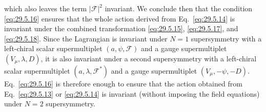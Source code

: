 which also leaves the term \(\lvert\mathcal{F}\rvert^2\) invariant. We
conclude then that the condition \eqref{eq:29.5.16} ensures that the whole
action derived from Eq.~\eqref{eq:29.5.14} is invariant under the combined
transformation \eqref{eq:29.5.15}, \eqref{eq:29.5.17}, and
\eqref{eq:29.5.18}. Since the Lagrangian is invariant under \(N=1\)
supersymmetry with a left-chiral scalar supermultiplet
\((a,\psi,\mathcal{F})\) and a gauge supermultiplet
\((V_\mu,\lambda,D)\), it is also invariant under a second supersymmetry
with a left-chiral scalar supermultiplet \((a,\lambda,\mathcal{F}^*)\) and a
gauge supermultiplet \((V_\mu,-\psi,-D)\). Eq.~\eqref{eq:29.5.16} is
therefore enough to ensure that the action obtained from
Eq.~\eqref{eq:29.5.13} or \eqref{eq:29.5.14} is invariant (without imposing
the field equations) under \(N=2\) supersymmetry.

